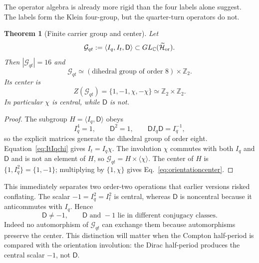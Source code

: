 \documentclass[11pt]{article}
\newtheorem{theorem}{Theorem}[section]
\theoremstyle{definition}\newtheorem{definition}[theorem]{Definition}
\theoremstyle{remark}\newtheorem{remark}[theorem]{Remark}\newtheorem{conjecture}[theorem]{Conjecture}
\begin{document}
The operator algebra is already more rigid than the four labels alone suggest. The labels form the Klein four-group, but the quarter-turn operators do not.

\begin{theorem}[Finite carrier group and center]\label{thm:orientationgroup}
Let
\begin{equation}
 \mathcal G_{qt}:=\langle I_q,I_t,\mathsf D\rangle
 \subset GL_{\mathbb C}(\widetilde{\mathcal H}_{\rm or}).
\end{equation}
Then $|\mathcal G_{qt}|=16$ and
\begin{equation}\label{eq:orientationgroupiso}
 \boxed{
 \mathcal G_{qt}\simeq
 (\text{dihedral group of order }8)\times\mathbb Z_2.}
\end{equation}
Its center is
\begin{equation}\label{eq:orientationcenter}
 \boxed{Z(\mathcal G_{qt})=\{1,-1,\chi,-\chi\}\simeq\mathbb Z_2\times\mathbb Z_2.}
\end{equation}
In particular $\chi$ is central, while $\mathsf D$ is not.
\end{theorem}
\begin{proof}
The subgroup $H=\langle I_q,\mathsf D\rangle$ obeys
\begin{equation}
 I_q^4=1,\qquad \mathsf D^2=1,\qquad
 \mathsf D I_q\mathsf D=I_q^{-1},
\end{equation}
so the explicit matrices generate the dihedral group of order eight. Equation~\eqref{eq:ItIqchi} gives $I_t=I_q\chi$. The involution $\chi$ commutes with both $I_q$ and $\mathsf D$ and is not an element of $H$, so $\mathcal G_{qt}=H\times\langle\chi\rangle$. The center of $H$ is $\{1,I_q^2\}=\{1,-1\}$; multiplying by $\{1,\chi\}$ gives Eq.~\eqref{eq:orientationcenter}.
\end{proof}

This immediately separates two order-two operations that earlier versions risked conflating. The scalar $-1=I_q^2=I_t^2$ is central, whereas $\mathsf D$ is noncentral because it anticommutes with $I_q$. Hence
\begin{equation}\label{eq:DnotminusI}
 \boxed{\mathsf D\neq-1,\qquad \mathsf D\text{ and }-1\text{ lie in different conjugacy classes}.}
\end{equation}
Indeed no automorphism of $\mathcal G_{qt}$ can exchange them because automorphisms preserve the center. This distinction will matter when the Compton half-period is compared with the orientation involution: the Dirac half-period produces the central scalar $-1$, not $\mathsf D$.
\end{document}
